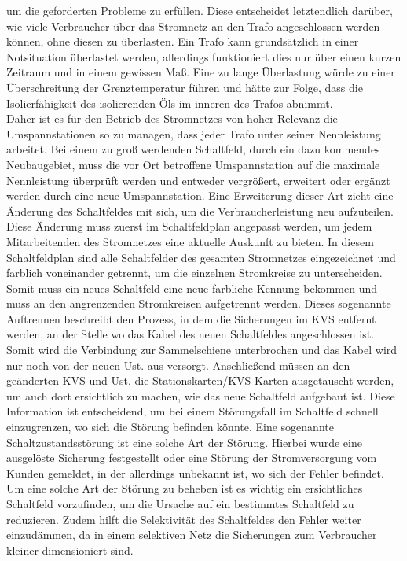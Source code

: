 um die geforderten Probleme zu erfüllen. Diese entscheidet letztendlich darüber, wie viele Verbraucher über das Stromnetz an den Trafo angeschlossen werden 
können, ohne diesen zu überlasten. Ein Trafo kann grundsätzlich in einer Notsituation überlastet werden, allerdings funktioniert dies nur über einen kurzen 
Zeitraum und in einem gewissen Maß. Eine zu lange Überlastung würde zu einer Überschreitung der Grenztemperatur führen und hätte zur Folge, dass die 
Isolierfähigkeit des isolierenden Öls im inneren des Trafos abnimmt. \autocite{Werth.2016}
\\
Daher ist es für den Betrieb des Stromnetzes von hoher Relevanz die Umspannstationen so zu managen, dass jeder Trafo unter seiner Nennleistung arbeitet. Bei 
einem zu groß werdenden Schaltfeld, durch ein \zB dazu kommendes Neubaugebiet, muss die vor Ort betroffene Umspannstation auf die maximale Nennleistung 
überprüft werden und entweder vergrößert, erweitert oder ergänzt werden durch eine neue Umspannstation. Eine Erweiterung dieser Art zieht eine Änderung des 
Schaltfeldes mit sich, um die Verbraucherleistung neu aufzuteilen. Diese Änderung muss zuerst im Schaltfeldplan angepasst werden, um jedem Mitarbeitenden 
des Stromnetzes eine aktuelle Auskunft zu bieten. In diesem Schaltfeldplan sind alle Schaltfelder des gesamten Stromnetzes eingezeichnet und farblich 
voneinander getrennt, um die einzelnen Stromkreise zu unterscheiden. Somit muss ein neues Schaltfeld eine neue farbliche Kennung bekommen und muss an den 
angrenzenden Stromkreisen aufgetrennt werden. Dieses sogenannte Auftrennen beschreibt den Prozess, in dem die Sicherungen im KVS entfernt werden, an der 
Stelle wo das Kabel des neuen Schaltfeldes angeschlossen ist. Somit wird die Verbindung zur Sammelschiene unterbrochen und das Kabel wird nur noch von der 
neuen Ust. aus versorgt. Anschließend müssen an den geänderten KVS und Ust. die Stationskarten/KVS-Karten ausgetauscht werden, um auch dort ersichtlich 
zu machen, wie das neue Schaltfeld aufgebaut ist. Diese Information ist entscheidend, um bei einem Störungsfall im Schaltfeld schnell einzugrenzen, wo 
sich die Störung befinden könnte. Eine sogenannte Schaltzustandsstörung ist \zB eine solche Art der Störung. Hierbei wurde eine ausgelöste Sicherung 
festgestellt oder eine Störung der Stromversorgung vom Kunden gemeldet, in der allerdings unbekannt ist, wo sich der Fehler befindet. Um eine solche Art 
der Störung zu beheben ist es wichtig ein ersichtliches Schaltfeld vorzufinden, um die Ursache auf ein bestimmtes Schaltfeld zu reduzieren. Zudem hilft 
die Selektivität des Schaltfeldes den Fehler weiter einzudämmen, da in einem selektiven Netz die Sicherungen zum Verbraucher kleiner dimensioniert sind. 
